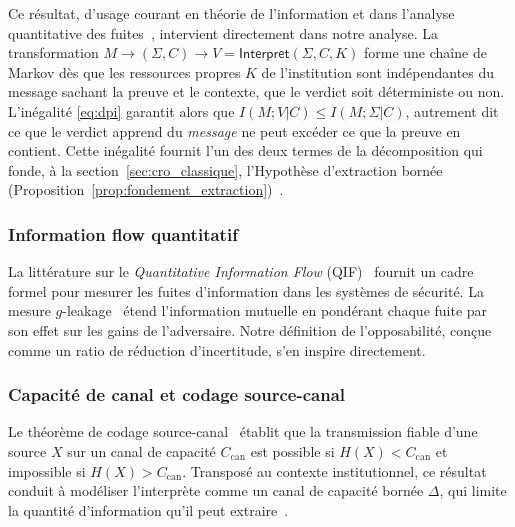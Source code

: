 \begin{sloppypar}
\noindent Ce r\'esultat, d'usage courant en th\'eorie de l'information et dans
l'analyse quantitative des fuites~\cite{Smith09,Alvim12}, intervient directement dans
notre analyse. La
transformation $M \to (\Sigma, C) \to V = \mathsf{Interpret}(\Sigma, C, K)$ forme
une cha\^ine de Markov d\`es que les ressources propres $K$ de l'institution sont
ind\'ependantes du message sachant la preuve et le contexte, que le verdict soit
d\'eterministe ou non. L'in\'egalit\'e \eqref{eq:dpi} garantit alors que
$I(M;V|C) \leq I(M;\Sigma|C)$, autrement dit ce que le verdict apprend du \emph{message} ne peut exc\'eder
ce que la preuve en contient. Cette in\'egalit\'e fournit l'un des deux termes de la
d\'ecomposition qui fonde, \`a la section~\ref{sec:cro_classique}, l'Hypoth\`ese
d'extraction born\'ee (Proposition~\ref{prop:fondement_extraction})~\cite{ClarksonSchneider10}.

\subsubsection{Information flow quantitatif}
\label{subsubsec:qif}

La litt\'erature sur le \emph{Quantitative Information Flow} (QIF)~\cite{Clarkson05,Smith09,Alvim12,Alvim18}
fournit un cadre formel pour mesurer les fuites d'information dans les syst\`emes
de s\'ecurit\'e. La mesure $g$-leakage~\cite{Alvim12} \'etend l'information mutuelle
en pond\'erant chaque fuite par son effet sur les gains de l'adversaire. Notre d\'efinition
de l'opposabilit\'e, con\c{c}ue comme un ratio de r\'eduction d'incertitude, s'en inspire directement.

\subsubsection{Capacit\'e de canal et codage source-canal}
\label{subsubsec:capacite_canal}

Le th\'eor\`eme de codage source-canal~\cite{Shannon48,CoverThomas06} \'etablit que
la transmission fiable d'une source $X$ sur un canal de capacit\'e $C_{\mathrm{can}}$ est possible
si $H(X) < C_{\mathrm{can}}$ et impossible si $H(X) > C_{\mathrm{can}}$. Transpos\'e au contexte institutionnel, ce r\'esultat conduit \`a
mod\'eliser l'interpr\`ete comme un canal de capacit\'e born\'ee $\Delta$, qui limite
la quantit\'e d'information qu'il peut extraire~\cite{WynerZiv76,Maurer1999}.
\end{sloppypar}

